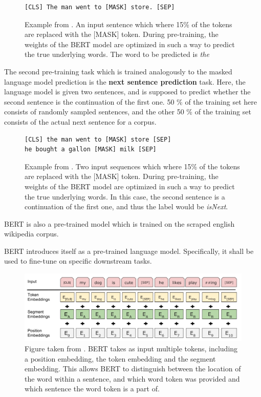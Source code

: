 \documentclass[a4paper,12pt,twoside,openright]{report}
\begin{document}
\begin{figure}[H]
\begin{verbatim}
[CLS] The man went to [MASK] store. [SEP]
\end{verbatim}
\caption{Example from \cite{devlin18}. 
An input sentence which where 15\% of the tokens are replaced with the [MASK] token. 
During pre-training, the weights of the BERT model are optimized in such a way to predict the true underlying words.
The word to be predicted is \textit{the}
}
\end{figure}

The second pre-training task which is trained analogously to the masked language model prediction is the \textbf{next sentence prediction} task.
Here, the language model is given two sentences, and is supposed to predict whether the second sentence is the continuation of the first one.
50 \% of the training set here consists of randomly sampled sentences, and the other 50 \% of the training set consists of the actual next sentence for a corpus.

\begin{figure}[H]
\begin{verbatim}
[CLS] the man went to [MASK] store [SEP]
he bought a gallon [MASK] milk [SEP]
\end{verbatim}
\caption{Example from \cite{devlin18}. 
Two input sequences which where 15\% of the tokens are replaced with the [MASK] token. 
During pre-training, the weights of the BERT model are optimized in such a way to predict the true underlying words.
In this case, the second sentence is a continuation of the first one, and thus the label would be \textit{isNext}.
}
\end{figure}




BERT is also a pre-trained model which is trained on the scraped english wikipedia corpus.

BERT introduces itself as a pre-trained language model.
Specifically, it shall be used to fine-tune on specific downstream tasks.



\begin{figure}[h]
	\center
  \includegraphics[width=\linewidth]{./assets/background/BERT_multiple_input_tokens.png}
  \caption{Figure taken from \cite{devlin18}. BERT takes as input multiple tokens, including a position embedding, the token embedding and the segment embedding. This allows BERT to distinguish between the location of the word within a sentence, and which word token was provided and which sentence the word token is a part of.}
  \label{fig:cbow_skipgram}
\end{figure}
\end{document}
